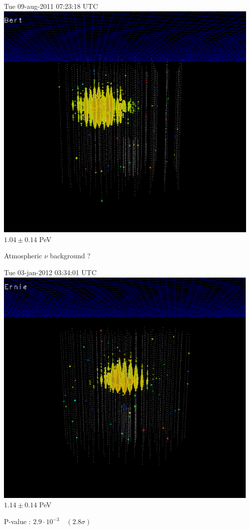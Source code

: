 \Tr
\begin{center}
{\blue Tue 09-aug-2011 07:23:18 UTC}\\
\includegraphics[keepaspectratio,width=13cm]{bert}\\
$1.04 \pm 0.14$ PeV
\end{center}
{\blue Atmospheric $\nu$ background ?}

\newpage

\begin{center}
{\blue Tue 03-jan-2012 03:34:01 UTC}\\
\includegraphics[keepaspectratio,width=13cm]{ernie}\\
$1.14 \pm 0.14$ PeV
\end{center}
{\blue P-value : $2.9 \cdot 10^{-3} \quad (2.8 \sigma)$}

